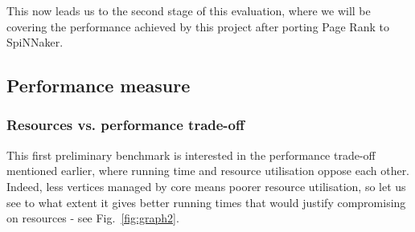 This now leads us to the second stage of this evaluation, where we will be covering the performance achieved by this project after porting Page Rank to SpiNNaker. \\

\subsection{Performance measure} \label{sec:perf}

\subsubsection{Resources vs. performance trade-off}

This first preliminary benchmark is interested in the performance trade-off mentioned earlier, where running time and resource utilisation oppose each other. Indeed, less vertices managed by core means poorer resource utilisation, so let us see to what extent it gives better running times that would justify compromising on resources - see Fig.~\ref{fig:graph2}.

